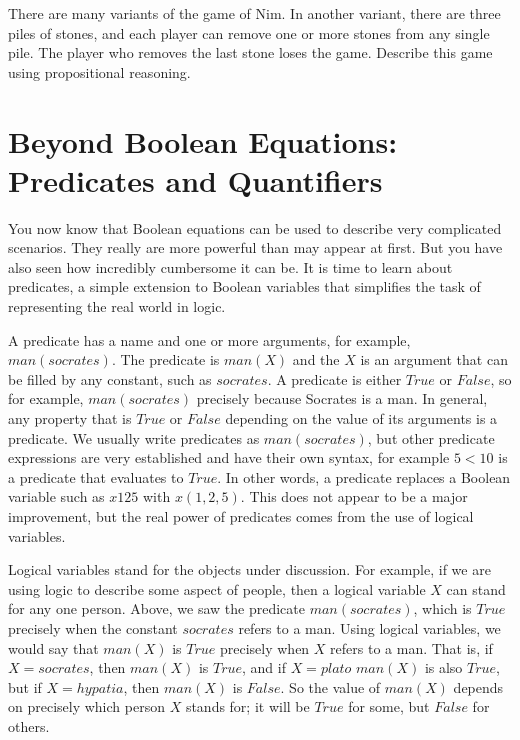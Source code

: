 {{\begin{ExerciseList}
\Exercise 
There are many variants of the game of Nim. In another variant, there are three piles of stones, and each player can remove
one or more stones from any single pile. The player who removes the last stone loses the game. Describe this game using
propositional reasoning.

\end{ExerciseList}

\section{Beyond Boolean Equations: Predicates and Quantifiers}

You now know that Boolean equations can be used to describe very complicated scenarios. They really are more powerful 
than may appear at first. But you have also seen how incredibly cumbersome it can be. It is time to learn about predicates, 
a simple extension to Boolean variables that simplifies the task of representing the real world in logic.

A predicate has a name and one or more arguments, for example, $man(socrates)$. 
The predicate is $man(X)$ and the $X$ is an argument that can be filled by any constant, 
such as $socrates$. A predicate is either $True$ or $False$, so for example, $man(socrates)$
precisely because Socrates is a man. In general, any property that is $True$ or $False$
depending on the value of its arguments is a predicate. We usually write predicates as
$man(socrates)$, but other predicate expressions are very established and have their 
own syntax, for example $5 < 10$ is a predicate that evaluates to $True$.
In other words, a predicate replaces a Boolean variable 
such as $x125$ with $x(1,2,5)$. This does not appear to be a major improvement, but the real power of predicates comes from 
the use of logical variables.

Logical variables stand for the objects under discussion. For example, if we are using logic to describe some aspect of
people, then a logical variable $X$ can stand for any one person. Above, we saw the predicate $man(socrates)$, which is $True$
precisely when the constant $socrates$ refers to a man. Using logical variables, we would say that $man(X)$ is $True$ precisely
when $X$ refers to a man. That is, if $X=socrates$, then $man(X)$ is $True$, and if $X=plato$ $man(X)$ is also $True$, but if
$X=hypatia$, then $man(X)$ is $False$. So the value of $man(X)$ depends on precisely which person $X$ stands for; it will be
$True$ for some, but $False$ for others.

}}
